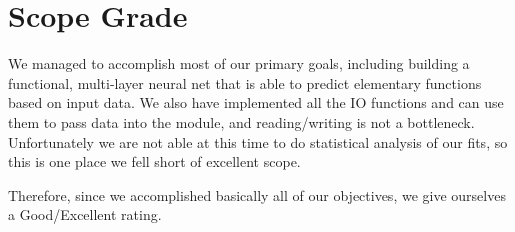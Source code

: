\documentclass{article}
\begin{document}
\section{Scope Grade}
\label{sec:scope}

We managed to accomplish most of our primary goals, including building a functional,
multi-layer neural net that is able to predict elementary functions based on input data.
We also have implemented all the IO functions and can use them to pass data into the module, and
reading/writing is not a bottleneck.
Unfortunately we are not able at this time to do statistical analysis of our fits, so this is one place we fell short of excellent scope. 


Therefore, since we accomplished basically all of our objectives, we give ourselves a Good/Excellent
rating.
\end{document}
